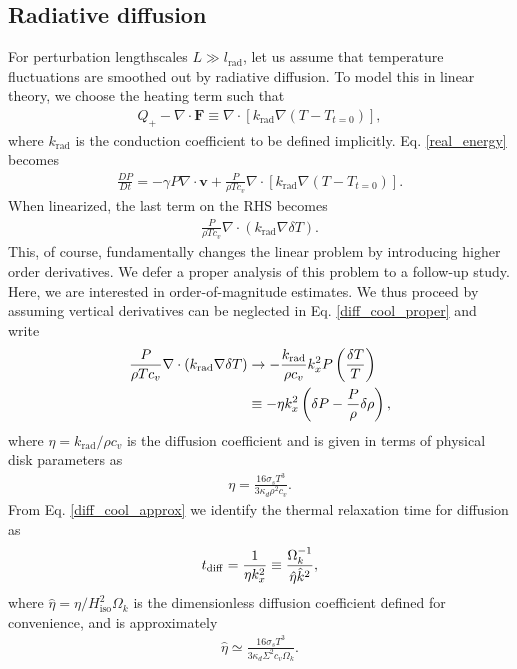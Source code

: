 \subsection{Radiative diffusion}
For perturbation lengthscales $L\gg l_\mathrm{rad}$, let us assume that
temperature fluctuations are smoothed out by radiative diffusion. To
model this in linear theory, we choose the heating term such that
\begin{align}
  Q_+ - \nabla\cdot\bm{F} \equiv \nabla\cdot\left[k_\mathrm{rad}\nabla
    \left(T-T_{t=0}\right)\right], 
\end{align} 
where $k_\mathrm{rad}$ is the conduction coefficient to be defined
implicitly. Eq. \ref{real_energy} becomes
\begin{align}
  \frac{DP}{Dt} = -\gamma P \nabla\cdot\bm{v} + \frac{P}{\rho T
    c_v}\nabla\cdot\left[k_\mathrm{rad}\nabla\left(T-T_{t=0}\right)\right].     
\end{align}
When linearized, the last term on the RHS becomes
\begin{align}\label{diff_cool_proper}
  \frac{P}{\rho T c_v} \nabla\cdot\left(k_\mathrm{rad}\nabla\delta
    T\right). 
\end{align}
This, of course, fundamentally changes the linear problem by
introducing higher order derivatives. We defer a proper analysis of
this problem to a follow-up study. Here, we are interested in
order-of-magnitude estimates. We thus proceed by assuming vertical
derivatives can be neglected in Eq. \ref{diff_cool_proper} and write
\begin{align}\label{diff_cool_approx}
  \frac{P}{\rho T c_v} \nabla\cdot\left(k_\mathrm{rad}\nabla\delta
    T\right) &\to -\frac{k_\mathrm{rad}}{\rho
    c_v}k_x^2P\left(\frac{\delta T}{T}\right)\notag\\
  &\equiv -\eta k_x^2 \left(\delta P - \frac{P}{\rho}\delta\rho\right), 
\end{align}
where $\eta=k_\mathrm{rad}/\rho c_v$ is the diffusion coefficient and
is given in terms of physical disk parameters as 
\begin{align}\label{eta_def}
  \eta = \frac{16\sigma_s T^3}{3\kappa_d\rho^2 c_v}. 
\end{align}
From Eq. \ref{diff_cool_approx} we identify the thermal relaxation
time for diffusion as 
\begin{align}\label{tc_diff_cool} 
  t_\mathrm{diff} = \frac{1}{\eta k_x^2}\equiv \frac{\Omega_k^{-1}}{\hat{\eta}\hat{k}^2}, 
\end{align}
where $\hat{\eta} = \eta/H_\mathrm{iso}^2\Omega_k$ is the 
dimensionless diffusion coefficient defined for convenience, and is
approximately 
\begin{align}\label{diff_coeff_dimensionless}
  \hat{\eta} \simeq  \frac{16\sigma_s T^3}{3\kappa_d\Sigma^2
    c_v\Omega_k}. 
\end{align}

